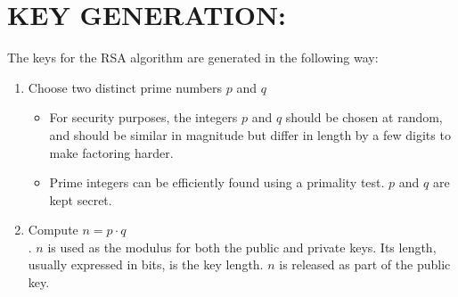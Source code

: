 \documentclass[10pt,fleqn]{article}
\begin{document}
\medskip{}


\section{KEY GENERATION:}

The keys for the RSA algorithm are generated in the following way:
\begin{enumerate}
\item Choose two distinct prime numbers $p$ and $q$
\begin{itemize}
\item For security purposes, the integers $p$ and $q$ should be chosen
at random, and should be similar in magnitude but differ in length
by a few digits to make factoring harder.
\item Prime integers can be efficiently found using a primality test. $p$
and $q$ are kept secret.
\end{itemize}
\item Compute $n = p\cdot q$\\. $n$ is used as the modulus for both the
public and private keys. Its length, usually expressed in bits, is
the key length. $n$ is released as part of the public key.
\end{enumerate}
\end{document}
